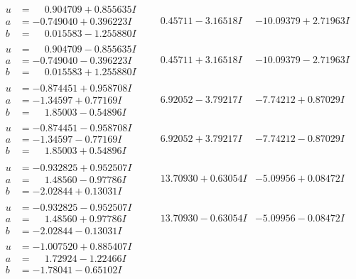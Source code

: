 \documentclass[1p]{elsarticle_modified}
\theoremstyle{definition}
\begin{document}
$$\begin{array}{c|c|c}
\begin{aligned}
u &= \phantom{-}0.904709 + 0.855635 I \\
a &= -0.749040 + 0.396223 I \\
b &= \phantom{-}0.015583 - 1.255880 I\end{aligned}
 & \phantom{-}0.45711 - 3.16518 I & -10.09379 + 2.71963 I \\ \hline\begin{aligned}
u &= \phantom{-}0.904709 - 0.855635 I \\
a &= -0.749040 - 0.396223 I \\
b &= \phantom{-}0.015583 + 1.255880 I\end{aligned}
 & \phantom{-}0.45711 + 3.16518 I & -10.09379 - 2.71963 I \\ \hline\begin{aligned}
u &= -0.874451 + 0.958708 I \\
a &= -1.34597 + 0.77169 I \\
b &= \phantom{-}1.85003 - 0.54896 I\end{aligned}
 & \phantom{-}6.92052 - 3.79217 I & -7.74212 + 0.87029 I \\ \hline\begin{aligned}
u &= -0.874451 - 0.958708 I \\
a &= -1.34597 - 0.77169 I \\
b &= \phantom{-}1.85003 + 0.54896 I\end{aligned}
 & \phantom{-}6.92052 + 3.79217 I & -7.74212 - 0.87029 I \\ \hline\begin{aligned}
u &= -0.932825 + 0.952507 I \\
a &= \phantom{-}1.48560 - 0.97786 I \\
b &= -2.02844 + 0.13031 I\end{aligned}
 & \phantom{-}13.70930 + 0.63054 I & -5.09956 + 0.08472 I \\ \hline\begin{aligned}
u &= -0.932825 - 0.952507 I \\
a &= \phantom{-}1.48560 + 0.97786 I \\
b &= -2.02844 - 0.13031 I\end{aligned}
 & \phantom{-}13.70930 - 0.63054 I & -5.09956 - 0.08472 I \\ \hline\begin{aligned}
u &= -1.007520 + 0.885407 I \\
a &= \phantom{-}1.72924 - 1.22466 I \\
b &= -1.78041 - 0.65102 I\end{aligned}

\end{array}$$
\end{document}
